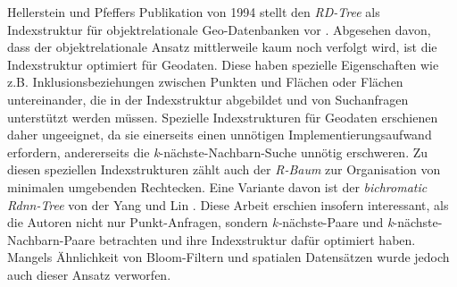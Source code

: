 Hellerstein und Pfeffers Publikation von 1994 stellt den \textit{RD-Tree} als Indexstruktur für objektrelationale Geo-Datenbanken vor \cite{Hellerstein1994}. Abgesehen davon, dass der objektrelationale Ansatz mittlerweile kaum noch verfolgt wird, ist die Indexstruktur optimiert für Geodaten. Diese haben spezielle Eigenschaften wie z.B. Inklusionsbeziehungen zwischen Punkten und Flächen oder Flächen untereinander, die in der Indexstruktur abgebildet und von Suchanfragen unterstützt werden müssen. Spezielle Indexstrukturen für Geodaten erschienen daher ungeeignet, da sie einerseits einen unnötigen Implementierungsaufwand erfordern, andererseits die \textit{k}-nächste-Nachbarn-Suche unnötig erschweren. Zu diesen speziellen Indexstrukturen zählt auch der \textit{R-Baum} zur Organisation von minimalen umgebenden Rechtecken. Eine Variante davon ist der \textit{bichromatic Rdnn-Tree} von der Yang und Lin \cite{Yang2002}. Diese Arbeit erschien insofern interessant, als die Autoren nicht nur Punkt-Anfragen, sondern \textit{k-}nächste-Paare und \textit{k}-nächste-Nachbarn-Paare betrachten und ihre Indexstruktur dafür optimiert haben. Mangels Ähnlichkeit von Bloom-Filtern und spatialen Datensätzen wurde jedoch auch dieser Ansatz verworfen. 

